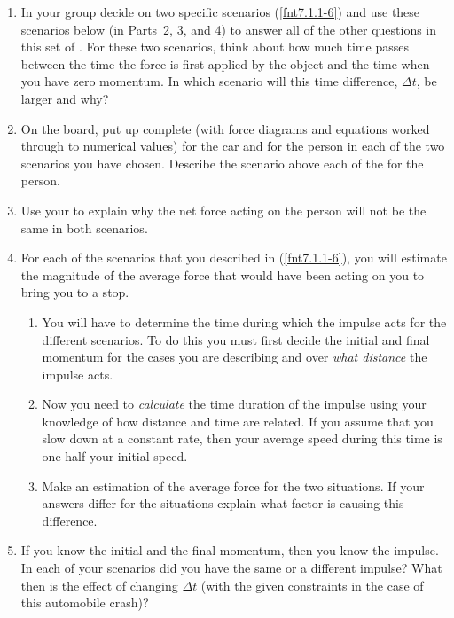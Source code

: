 \begin{enumerate}
	\item In your group decide on two specific scenarios (\ref{fnt7.1.1-6}) and use these scenarios below (in Parts~2, 3, and 4) to answer all of the other questions in this set of \FNTs. For these two scenarios, think about how much time passes between the time the force is first applied by the object and the time when you have zero momentum. In which scenario will this time difference, $\Delta t$, be larger and why?
	
	\item  On the board, put up complete \pcharts{} (with force diagrams and equations worked through to numerical values) for the car and for the person in each of the two scenarios you have chosen. Describe the scenario above each of the \pcharts{} for the person.
	
	\item Use your \pcharts{} to explain why the net force acting on the person will not be the same in both scenarios.
	
	\item For each of the scenarios that you described in (\ref{fnt7.1.1-6}), you will estimate the magnitude of the average force that would have been acting on you to bring you to a stop.
	\begin{enumerate}
		\item You will have to determine the time during which the impulse acts for the different scenarios. To do this you must first decide the initial and final momentum for the cases you are describing and over \emph{what distance} the impulse acts.
		
		\item Now you need to \emph{calculate} the time duration of the impulse using your knowledge of how distance and time are related. If you assume that you slow down at a constant rate, then your average speed during this time is one-half your initial speed.
		
		\item Make an estimation of the average force for the two situations. If your answers differ for the situations explain what factor is causing this difference.
	\end{enumerate}
	
	\item If you know the initial and the final momentum, then you know the impulse. In each of your scenarios did you have the same or a different impulse? What then is the effect of changing $\Delta t$ (with the given constraints in the case of this automobile crash)?
\end{enumerate}

